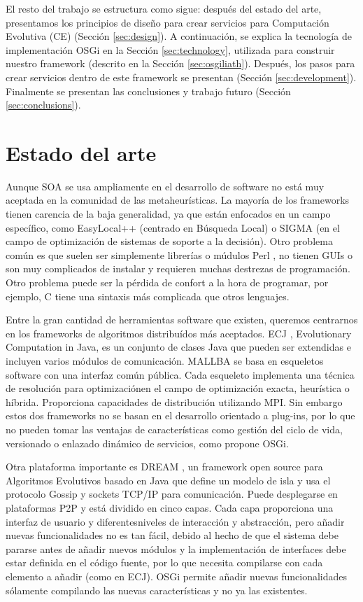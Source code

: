\documentclass[runningheads]{llncs}
\begin{document}
El resto del trabajo se estructura como sigue: después del estado del arte, presentamos los principios de diseño para crear servicios para Computación Evolutiva (CE) (Sección \ref{sec:design}). A continuación, se explica la tecnología de implementación OSGi en la Sección \ref{sec:technology}, utilizada para construir nuestro framework (descrito en la Sección \ref{sec:osgiliath}). Después, los pasos para crear servicios dentro de este framework se presentan (Sección \ref{sec:development}). Finalmente se presentan las conclusiones y trabajo futuro (Sección \ref{sec:conclusions}).



\section{Estado del arte}
\label{sec:soa}

Aunque SOA se usa ampliamente en el desarrollo de software no está muy aceptada en la comunidad de las metaheurísticas. La mayoría de los frameworks tienen carencia de la baja generalidad, ya que están enfocados en un campo específico, como EasyLocal++ \cite{EASYLOCAL}(centrado en Búsqueda Local) o SIGMA \cite{SIGMA} (en el campo de optimización de sistemas de soporte  a la decisión). Otro problema común es que suelen ser simplemente librerías o múdulos Perl \cite{PERL}, no tienen GUIs o son muy complicados de instalar y requieren muchas destrezas de programación. Otro problema puede ser la pérdida de confort a la hora de programar, por ejemplo, C tiene una sintaxis más complicada que otros lenguajes.

Entre la gran cantidad de herramientas software que existen, queremos centrarnos en los frameworks de algoritmos distribuídos más aceptados. ECJ \cite{ECJ}, Evolutionary Computation in Java, es un conjunto de clases Java que pueden ser extendidas e incluyen varios módulos de comunicación. MALLBA \cite{MALLBA} se basa en esqueletos software con una interfaz común pública. Cada esqueleto implementa una técnica de resolución para optimizaciónen el campo de optimización exacta, heurística o híbrida. Proporciona capacidades de distribución utilizando MPI. Sin embargo estos dos frameworks no se basan en el desarrollo orientado a plug-ins, por lo que no pueden tomar las ventajas de características como gestión del ciclo de vida, versionado o enlazado dinámico de servicios, como propone OSGi.

Otra plataforma importante es DREAM \cite{DREAM}, un framework open source para Algoritmos Evolutivos basado en Java que define un modelo de isla y usa el protocolo Gossip y sockets TCP/IP para comunicación. Puede desplegarse en plataformas P2P y está dividido en cinco capas. Cada capa proporciona una interfaz de usuario y diferentesniveles de interacción y abstracción, pero añadir nuevas funcionalidades no es tan fácil, debido al hecho de que el sistema debe pararse antes de añadir nuevos módulos y la implementación de interfaces debe estar definida en el código fuente, por lo que necesita compilarse con cada elemento a añadir (como en ECJ). OSGi permite añadir nuevas funcionalidades sólamente compilando las nuevas características y no ya las existentes.
\end{document}
